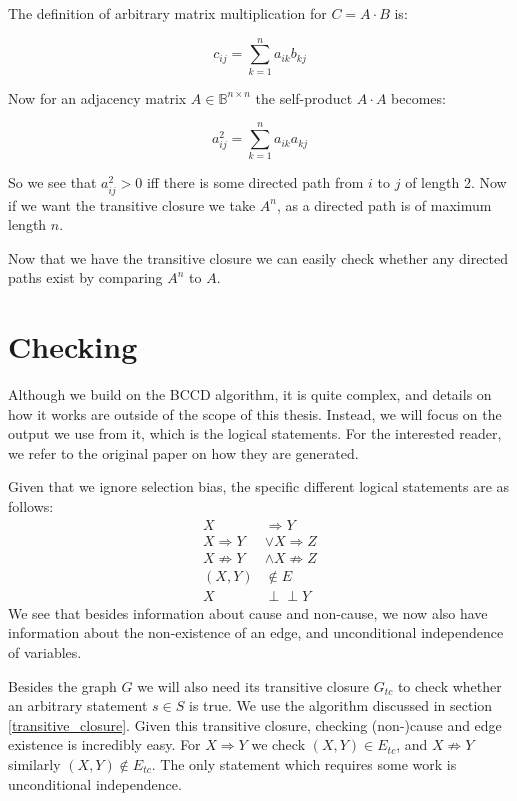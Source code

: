 \documentclass[11pt,a4paper]{report}
\def\ci{\perp\!\!\!\perp}
\begin{document}
The definition of arbitrary matrix multiplication for $C = A \cdot B$ is:

\begin{equation*}
  c_{ij} = \sum ^n_{k=1} a_{ik}b_{kj}
\end{equation*}

Now for an adjacency matrix $A \in \mathbb{B}^{n \times n}$ the
self-product $A \cdot A$ becomes:

\begin{equation*}
  a^2_{ij} = \sum ^n_{k=1} a_{ik}a_{kj}
\end{equation*}

So we see that $a^2_{ij} > 0$ iff there is some directed path from $i$ to
$j$ of length 2. Now if we want the transitive closure we take $A^n$, as a
directed path is of maximum length $n$.

Now that we have the transitive closure we can easily check whether any
directed paths exist by comparing $A^n$ to $A$.

\section{Checking}\label{checking}
Although we build on the BCCD algorithm, it is quite complex, and details
on how it works are outside of the scope of this thesis. Instead, we will
focus on the output we use from it, which is the logical statements. For
the interested reader, we refer to the original paper on how they are
generated\cite{claassenBayesianApproachConstraint2012}.

Given that we ignore selection bias, the specific different logical
statements are as follows:
\begin{align*}
  X &\Rightarrow Y \\
  X \Rightarrow Y &\lor X \Rightarrow Z \\
  X \not \Rightarrow Y &\land X \not \Rightarrow Z \\
  (X, Y) &\notin E \\
  X &\ci Y
\end{align*}
We see that besides information about cause and non-cause, we now also
have information about the non-existence of an edge, and unconditional
independence of variables.

Besides the graph $G$ we will also need its transitive closure $G_{tc}$ to
check whether an arbitrary statement $s \in S$ is true. We use the
algorithm discussed in section \ref{transitive_closure}. Given this
transitive closure, checking (non-)cause and edge existence is incredibly
easy. For $X \Rightarrow Y$ we check $(X, Y) \in E_{tc}$, and $X \not
\Rightarrow Y$ similarly $(X, Y) \notin E_{tc}$. The only statement which
requires some work is unconditional independence.
\end{document}
